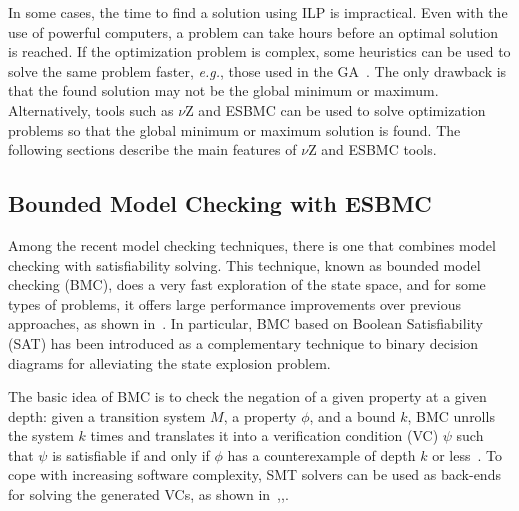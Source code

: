 In some cases, the time to find a solution using ILP is impractical. Even with the use of powerful computers, a problem can take hours before an optimal solution is reached. If the optimization problem is complex, some heuristics can be used to solve the same problem faster, {\it e.g.}, those used in the GA~\cite{Rao2009}. The only drawback is that the found solution may not be the global minimum or maximum. Alternatively, tools such as $\nu$Z and ESBMC can be used to solve optimization problems so that the global minimum or maximum solution is found. The following sections describe the main features of $\nu$Z and ESBMC tools.

\subsection{Bounded Model Checking with ESBMC}
\label{Bounded-Model-Checking-with-ESBMC}


Among the recent model checking techniques, there is one that combines model checking with satisﬁability solving. This technique, known as bounded model checking (BMC), does a very fast exploration of the state space, and for some types of problems, it offers large performance improvements over previous approaches, as shown in~\cite{Biere2009}. In particular, BMC based on Boolean Satisfiability (SAT) has been introduced as a complementary technique to binary decision diagrams for alleviating the state explosion problem. 

The basic idea of BMC is to check the negation of a given property at a given depth: given a transition system $M$, a property $\phi$, and a bound $k$, BMC unrolls the system $k$ times and translates it into a verification condition (VC) $\psi$  such that $\psi$ is satisfiable if and only if $\phi$ has a counterexample of depth $k$ or less~\cite{Biere2009}. To cope with increasing software complexity, SMT solvers can be used as back-ends for solving the generated VCs, as shown in~\cite{Armando2009},\cite{Ganai2006},\cite{Cordeiro2012}. 

